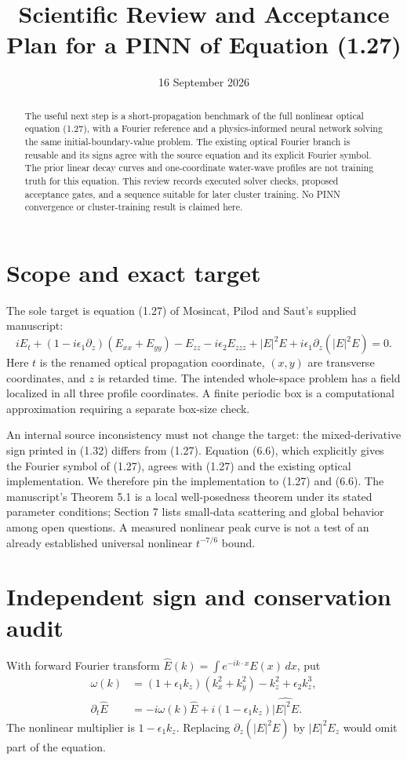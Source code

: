 \documentclass[11pt]{article}
\title{Scientific Review and Acceptance Plan for a PINN of Equation (1.27)}
\author{}
\date{16 September 2026}
\begin{document}
\maketitle
\begin{abstract}
The useful next step is a short-propagation benchmark of the full nonlinear optical equation (1.27), with a Fourier reference and a physics-informed neural network solving the same initial-boundary-value problem. The existing optical Fourier branch is reusable and its signs agree with the source equation and its explicit Fourier symbol. The prior linear decay curves and one-coordinate water-wave profiles are not training truth for this equation. This review records executed solver checks, proposed acceptance gates, and a sequence suitable for later cluster training. No PINN convergence or cluster-training result is claimed here.
\end{abstract}
\section{Scope and exact target}
The sole target is equation (1.27) of Mosincat, Pilod and Saut's supplied manuscript:
\begin{equation}\label{eq:target}
iE_t+(1-i\epsilon_1\partial_z)(E_{xx}+E_{yy})-E_{zz}
-i\epsilon_2 E_{zzz}+|E|^2E+i\epsilon_1\partial_z(|E|^2E)=0.
\end{equation}
Here $t$ is the renamed optical propagation coordinate, $(x,y)$ are transverse coordinates, and $z$ is retarded time. The intended whole-space problem has a field localized in all three profile coordinates. A finite periodic box is a computational approximation requiring a separate box-size check.

An internal source inconsistency must not change the target: the mixed-derivative sign printed in (1.32) differs from (1.27). Equation (6.6), which explicitly gives the Fourier symbol of (1.27), agrees with (1.27) and the existing optical implementation. We therefore pin the implementation to (1.27) and (6.6). The manuscript's Theorem 5.1 is a local well-posedness theorem under its stated parameter conditions; Section 7 lists small-data scattering and global behavior among open questions. A measured nonlinear peak curve is not a test of an already established universal nonlinear $t^{-7/6}$ bound.

\section{Independent sign and conservation audit}
With forward Fourier transform $\widehat E(k)=\int e^{-ik\cdot x}E(x)\,dx$, put
\begin{align}
\omega(k)&=(1+\epsilon_1 k_z)(k_x^2+k_y^2)-k_z^2+\epsilon_2 k_z^3,\\
\partial_t\widehat E&=-i\omega(k)\widehat E+i(1-\epsilon_1k_z)\widehat{|E|^2E}.
\end{align}
The nonlinear multiplier is $1-\epsilon_1k_z$. Replacing $\partial_z(|E|^2E)$ by $|E|^2E_z$ would omit part of the equation.
\end{document}
